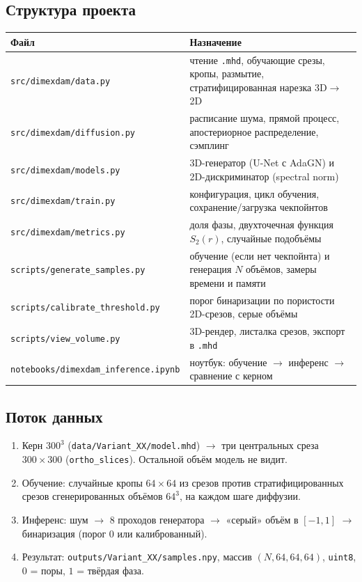 \documentclass[11pt,a4paper]{article}
\newcommand{\code}[1]{\texttt{#1}}
\begin{document}
\subsection{Структура проекта}
\begin{center}
\begin{tabularx}{\textwidth}{@{}lX@{}}
\toprule
Файл & Назначение \\
\midrule
\code{src/dimexdam/data.py} & чтение \code{.mhd}, обучающие срезы, кропы, размытие, стратифицированная нарезка 3D$\to$2D \\
\code{src/dimexdam/diffusion.py} & расписание шума, прямой процесс, апостериорное распределение, сэмплинг \\
\code{src/dimexdam/models.py} & 3D-генератор (U-Net с AdaGN) и 2D-дискриминатор (spectral norm) \\
\code{src/dimexdam/train.py} & конфигурация, цикл обучения, сохранение/загрузка чекпойнтов \\
\code{src/dimexdam/metrics.py} & доля фазы, двухточечная функция $S_2(r)$, случайные подобъёмы \\
\code{scripts/generate\_samples.py} & обучение (если нет чекпойнта) и генерация $N$ объёмов, замеры времени и памяти \\
\code{scripts/calibrate\_threshold.py} & порог бинаризации по пористости 2D-срезов, серые объёмы \\
\code{scripts/view\_volume.py} & 3D-рендер, листалка срезов, экспорт в \code{.mhd} \\
\code{notebooks/dimexdam\_inference.ipynb} & ноутбук: обучение $\to$ инференс $\to$ сравнение с керном \\
\bottomrule
\end{tabularx}
\end{center}

\subsection{Поток данных}
\begin{enumerate}
  \item Керн $300^3$ (\code{data/Variant\_XX/model.mhd}) $\to$ три центральных среза $300\times300$
        (\code{ortho\_slices}). Остальной объём модель не видит.
  \item Обучение: случайные кропы $64\times64$ из срезов против стратифицированных срезов сгенерированных
        объёмов $64^3$, на каждом шаге диффузии.
  \item Инференс: шум $\to$ 8 проходов генератора $\to$ «серый» объём в $[-1,1]$ $\to$ бинаризация
        (порог 0 или калиброванный).
  \item Результат: \code{outputs/Variant\_XX/samples.npy}, массив $(N,64,64,64)$, \code{uint8},
        $0$ = поры, $1$ = твёрдая фаза.
\end{enumerate}
\end{document}
